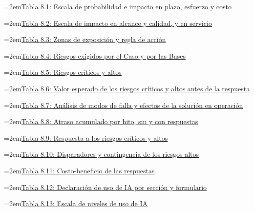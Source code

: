 \documentclass[11pt]{article}
\begin{document}
\noindent\hangindent=2em\hyperref[tab:8-1]{Tabla 8.1: Escala de probabilidad e impacto en plazo, esfuerzo y costo}\dotfill\pageref{tab:8-1}\par\vspace{0.4\baselineskip}
\noindent\hangindent=2em\hyperref[tab:8-2]{Tabla 8.2: Escala de impacto en alcance y calidad, y en servicio}\dotfill\pageref{tab:8-2}\par\vspace{0.4\baselineskip}
\noindent\hangindent=2em\hyperref[tab:8-3]{Tabla 8.3: Zonas de exposición y regla de acción}\dotfill\pageref{tab:8-3}\par\vspace{0.4\baselineskip}
\noindent\hangindent=2em\hyperref[tab:8-4]{Tabla 8.4: Riesgos exigidos por el Caso y por las Bases}\dotfill\pageref{tab:8-4}\par\vspace{0.4\baselineskip}
\noindent\hangindent=2em\hyperref[tab:8-5]{Tabla 8.5: Riesgos críticos y altos}\dotfill\pageref{tab:8-5}\par\vspace{0.4\baselineskip}
\noindent\hangindent=2em\hyperref[tab:8-6]{Tabla 8.6: Valor esperado de los riesgos críticos y altos antes de la respuesta}\dotfill\pageref{tab:8-6}\par\vspace{0.4\baselineskip}
\noindent\hangindent=2em\hyperref[tab:8-7]{Tabla 8.7: Análisis de modos de falla y efectos de la solución en operación}\dotfill\pageref{tab:8-7}\par\vspace{0.4\baselineskip}
\noindent\hangindent=2em\hyperref[tab:8-8]{Tabla 8.8: Atraso acumulado por hito, sin y con respuestas}\dotfill\pageref{tab:8-8}\par\vspace{0.4\baselineskip}
\noindent\hangindent=2em\hyperref[tab:8-9]{Tabla 8.9: Respuesta a los riesgos críticos y altos}\dotfill\pageref{tab:8-9}\par\vspace{0.4\baselineskip}
\noindent\hangindent=2em\hyperref[tab:8-10]{Tabla 8.10: Disparadores y contingencia de los riesgos altos}\dotfill\pageref{tab:8-10}\par\vspace{0.4\baselineskip}
\noindent\hangindent=2em\hyperref[tab:8-11]{Tabla 8.11: Costo-beneficio de las respuestas}\dotfill\pageref{tab:8-11}\par\vspace{0.4\baselineskip}
\noindent\hangindent=2em\hyperref[tab:8-12]{Tabla 8.12: Declaración de uso de IA por sección y formulario}\dotfill\pageref{tab:8-12}\par\vspace{0.4\baselineskip}
\noindent\hangindent=2em\hyperref[tab:8-13]{Tabla 8.13: Escala de niveles de uso de IA}\dotfill\pageref{tab:8-13}\par\vspace{0.4\baselineskip}
\clearpage
\end{document}
